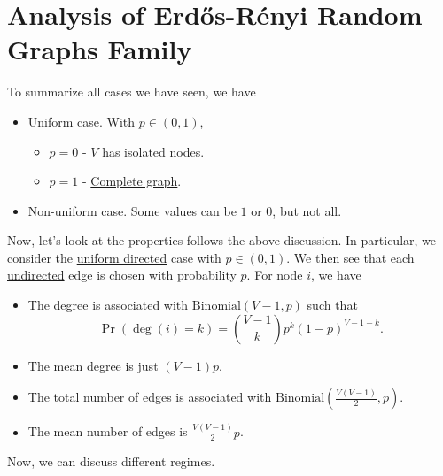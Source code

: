 \section{Analysis of Erdős-Rényi Random Graphs Family}
\begin{prev}
	To summarize all cases we have seen, we have
	\begin{itemize}
		\item Uniform case. With \(p\in(0, 1)\),
		      \begin{itemize}
			      \item \(p = 0\) - \(V\) has isolated nodes.
			      \item \(p = 1\) - \hyperref[def:complete-graph]{Complete graph}.
		      \end{itemize}
		\item Non-uniform case. Some values can be \(1\) or \(0\), but not all.
	\end{itemize}
\end{prev}

Now, let's look at the properties follows the above discussion. In particular, we consider the \hyperref[subsec:uniform-and-directed-model]{uniform directed} case with \(p\in(0, 1)\). We then see that each \hyperref[def:undirected-graph]{undirected} edge is chosen with probability \(p\). For node \(i\), we have
\begin{itemize}
	\item The \hyperref[def:degree]{degree} is associated with
	      \(\mathrm{Binomial}(V-1, p)\) such that
	      \[
		      \Pr(\deg(i) = k) = \binom{V-1}{k}p^k (1 - p)^{V-1-k}.
	      \]
	\item The mean \hyperref[def:degree]{degree} is just \((V-1)p\).
	\item The total number of edges is associated with \(\mathrm{Binomial}\left(\frac{V(V-1)}{2}, p\right)\).
	\item The mean number of edges is \(\frac{V(V-1)}{2}p\).
\end{itemize}

Now, we can discuss different regimes.

